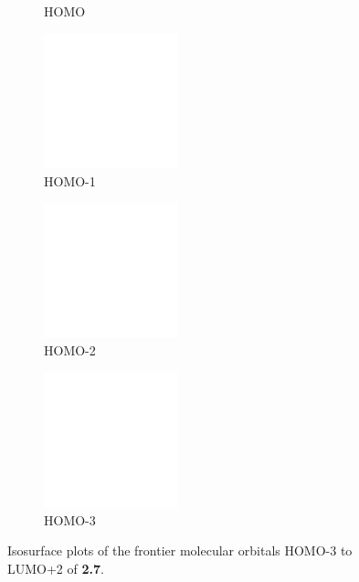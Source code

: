 \begin{figure}[!ht]
\begin{subfigure}[b]{0.31\textwidth}
  \caption{HOMO}
 \end{subfigure}
 \begin{subfigure}[b]{0.31\textwidth}
  \includegraphics[clip=true, width=\textwidth, height=39mm, keepaspectratio]{images/mos/7h-1.eps}
  \caption{HOMO-1}
 \end{subfigure}
 \begin{subfigure}[b]{0.31\textwidth}
  \includegraphics[clip=true, width=\textwidth, height=39mm, keepaspectratio]{images/mos/7h-2.eps}
  \caption{HOMO-2}
 \end{subfigure}
 \begin{subfigure}[b]{0.31\textwidth}
  \includegraphics[clip=true, width=\textwidth, height=39mm, keepaspectratio]{images/mos/7h-3.eps}
  \caption{HOMO-3}
 \end{subfigure}
\caption[Molecular orbitals HOMO-3 to LUMO+2 of \textbf{2.7}.]{Isosurface plots of the frontier molecular orbitals HOMO-3 to LUMO+2 of \textbf{2.7}.}
\label{fig.mo27}
\end{figure} 

